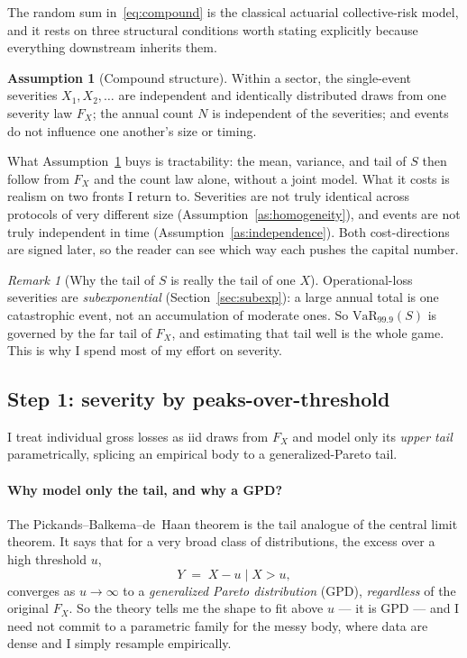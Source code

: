 \documentclass[11pt]{article}
\theoremstyle{definition}
\theoremstyle{remark}
\newtheorem{remark}[theorem]{Remark}
\theoremstyle{definition}
\newtheorem{assumption}{Assumption}
\newcommand{\VaR}{\mathrm{VaR}}
\newcommand{\1}{\mathbf{1}}
\begin{document}
The random sum in~\eqref{eq:compound} is the classical actuarial
collective-risk model, and it rests on three structural conditions worth
stating explicitly because everything downstream inherits them.

\begin{assumption}[Compound structure]\label{as:compound}
Within a sector, the single-event severities $X_1,X_2,\dots$ are independent and
identically distributed draws from one severity law $F_X$; the annual count $N$
is independent of the severities; and events do not influence one another's
size or timing.
\end{assumption}

\noindent What Assumption~\ref{as:compound} buys is tractability: the mean,
variance, and tail of $S$ then follow from $F_X$ and the count law alone,
without a joint model. What it costs is realism on two fronts I return to.
Severities are not truly identical across protocols of very different size
(Assumption~\ref{as:homogeneity}), and events are not truly independent in time
(Assumption~\ref{as:independence}). Both cost-directions are signed later, so
the reader can see which way each pushes the capital number.

\begin{remark}[Why the tail of $S$ is really the tail of one $X$]
Operational-loss severities are \emph{subexponential} (Section~\ref{sec:subexp}): a
large annual total is one catastrophic event, not an accumulation of moderate
ones. So $\VaR_{99.9}(S)$ is governed by the far tail of $F_X$, and estimating
that tail well is the whole game. This is why I spend most of my effort on
severity.
\end{remark}

\subsection{Step 1: severity by peaks-over-threshold}\label{sec:severity}

I treat individual gross losses as iid draws from $F_X$ and model only its
\emph{upper tail} parametrically, splicing an empirical body to a
generalized-Pareto tail.

\paragraph{Why model only the tail, and why a GPD?}
The Pickands--Balkema--de~Haan theorem is the tail analogue of the central
limit theorem. It says that for a very broad class of distributions, the excess
over a high threshold $u$,
\[
Y \;=\; X - u \mid X > u,
\]
converges as $u \to \infty$ to a \emph{generalized Pareto distribution} (GPD),
\emph{regardless} of the original $F_X$. So the theory tells me the shape to
fit above $u$ --- it is GPD --- and I need not commit to a parametric family
for the messy body, where data are dense and I simply resample empirically.
\end{document}
